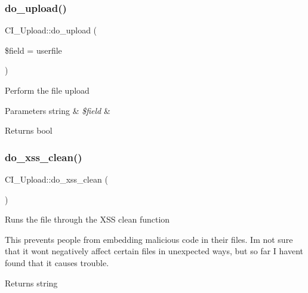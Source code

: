 \subsubsection{\texorpdfstring{do\+\_\+upload()}{do\_upload()}}
{\footnotesize\ttfamily C\+I\+\_\+\+Upload\+::do\+\_\+upload (\begin{DoxyParamCaption}\item[{}]{\$field = {\ttfamily \textquotesingle{}userfile\textquotesingle{}} }\end{DoxyParamCaption})}

Perform the file upload


\begin{DoxyParams}[1]{Parameters}
string & {\em \$field} & \\
\hline
\end{DoxyParams}
\begin{DoxyReturn}{Returns}
bool 
\end{DoxyReturn}
\mbox{\label{class_c_i___upload_a7b7e8c47df50e999419a178ac56aa2dc}} 
\subsubsection{\texorpdfstring{do\+\_\+xss\+\_\+clean()}{do\_xss\_clean()}}
{\footnotesize\ttfamily C\+I\+\_\+\+Upload\+::do\+\_\+xss\+\_\+clean (\begin{DoxyParamCaption}{ }\end{DoxyParamCaption})}

Runs the file through the X\+SS clean function

This prevents people from embedding malicious code in their files. I\textquotesingle{}m not sure that it won\textquotesingle{}t negatively affect certain files in unexpected ways, but so far I haven\textquotesingle{}t found that it causes trouble.

\begin{DoxyReturn}{Returns}
string 
\end{DoxyReturn}
\mbox{\label{class_c_i___upload_a7f6d9ce01c82e6b31129cd7259de5f3c}} 
